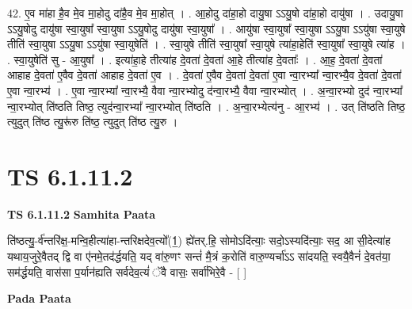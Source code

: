 \documentclass[17pt]{extarticle}
\begin{document}
42. ए॒व मा॑हा है॒व मे॒व मा॒होदु दा॑है॒व मे॒व मा॒होत् । . आ॒होदु दा॑हा॒हो दायु॒षा ऽऽयु॒षो दा॑हा॒हो दायु॑षा । . उदायु॒षा ऽऽयु॒षोदु दायु॑षा स्वा॒युषा᳚ स्वा॒युषा ऽऽयु॒षोदु दायु॑षा स्वा॒युषा᳚ । . आयु॑षा स्वा॒युषा᳚ स्वा॒युषा ऽऽयु॒षा ऽऽयु॑षा स्वा॒युषे तीति॑ स्वा॒युषा ऽऽयु॒षा ऽऽयु॑षा स्वा॒युषेति॑ । . स्वा॒युषे तीति॑ स्वा॒युषा᳚ स्वा॒युषे त्या॑हा॒हेति॑ स्वा॒युषा᳚ स्वा॒युषे त्या॑ह । . स्वा॒युषेति॑ सु - आ॒युषा᳚ । . इत्या॑हा॒हे तीत्या॑ह दे॒वता॑ दे॒वता॑ आ॒हे तीत्या॑ह दे॒वताः᳚ । . आ॒ह॒ दे॒वता॑ दे॒वता॑ आहाह दे॒वता॑ ए॒वैव दे॒वता॑ आहाह दे॒वता॑ ए॒व । . दे॒वता॑ ए॒वैव दे॒वता॑ दे॒वता॑ ए॒वा न्वा॒रभ्या᳚ न्वा॒रभ्यै॒व दे॒वता॑ दे॒वता॑ ए॒वा न्वा॒रभ्य॑ । . ए॒वा न्वा॒रभ्या᳚ न्वा॒रभ्यै॒ वैवा न्वा॒रभ्योदु द॑न्वा॒रभ्यै॒ वैवा न्वा॒रभ्योत् । . अ॒न्वा॒रभ्यो दुद॑ न्वा॒रभ्या᳚ न्वा॒रभ्योत् ति॑ष्ठति तिष्ठ॒ त्युद॑न्वा॒रभ्या᳚ न्वा॒रभ्योत् ति॑ष्ठति । . अ॒न्वा॒रभ्येत्य॑नु - आ॒रभ्य॑ । . उत् ति॑ष्ठति तिष्ठ॒ त्युदुत् ति॑ष्ठ त्यु॒रू॑रु ति॑ष्ठ॒ त्युदुत् ति॑ष्ठ त्यु॒रु । \newline
\pagebreak
{}

\section{ TS 6.1.11.2 }

\textbf{TS 6.1.11.2 } \newline
\textbf{Samhita Paata} \newline

ति॑ष्ठत्यु॒-र्व॑न्तरि॑क्ष॒-मन्वि॒हीत्या॑हा-न्तरिक्षदेव॒त्यो᳚(1॒) ह्ये॑तर्.हि॒ सोमोऽदि॑त्याः॒ सदो॒ऽस्यदि॑त्याः॒ सद॒ आ सी॒देत्या॑ह यथाय॒जुरे॒वैतद् द्वि वा ए॑नमे॒तद॑र्द्धयति॒ यद् वा॑रु॒णꣳ सन्तं॑ मै॒त्रं क॒रोति॑ वारु॒ण्यर्चा॑ऽऽ सा॑दयति॒ स्वयै॒वैनं॑ दे॒वत॑या॒ सम॑र्द्धयति॒ वास॑सा प॒र्यान॑ह्यति सर्वदेव॒त्यं॑ ॅवै वासः॒ सर्वा॑भिरे॒वै - [  ] \newline

\textbf{Pada Paata} \newline
\end{document}
